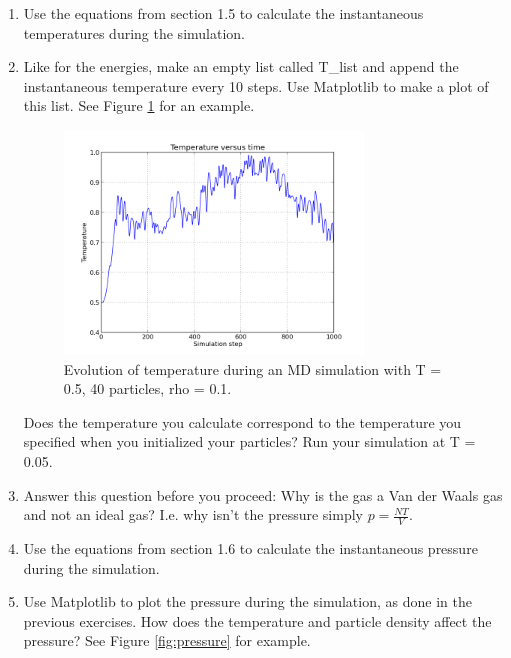 \documentclass{article}
\begin{document}
\begin{enumerate}[resume]
    \item Use the equations from section 1.5 to calculate the instantaneous
    temperatures during the simulation. 

    \item Like for the energies, make an empty list called T\_list and append the instantaneous temperature every 10 steps.
        Use Matplotlib to make a plot of this list. See Figure \ref{fig:temperature} for an example.

    \begin{figure}[h!]
        \begin{center}
            \includegraphics[width=0.75\textwidth]{temperature.png}
            \caption{Evolution of temperature during an MD simulation with T = 0.5, 40 particles, rho = 0.1.}
            \label{fig:temperature}
        \end{center}
    \end{figure}

    Does the temperature you calculate correspond to the temperature you specified when you initialized your particles?
    Run your simulation at T = 0.05.

    \item Answer this question before you proceed: Why is the gas a Van der Waals gas and not an ideal gas?
        I.e. why isn't the pressure simply $p = \frac{N T}{V}$.

    \item
        Use the equations from section 1.6 to calculate the instantaneous pressure during the simulation. 

    \item Use Matplotlib to plot the pressure during the simulation, as done in the previous exercises.
        How does the temperature and particle density affect the pressure?
        See Figure \ref{fig:pressure} for example.


\end{enumerate}
\end{document}
